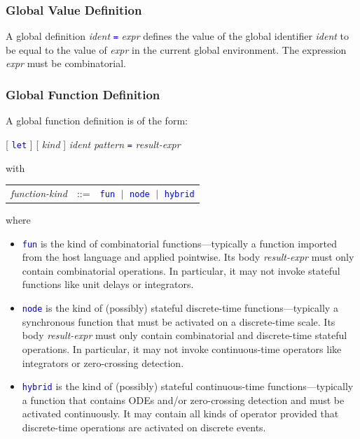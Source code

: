 \documentclass[11pt,titlepage,twoside]{report}
\newcommand{\alt}{\;|\;}
\newcommand{\term}[1]{\textcolor{Blue}{\tt #1}}
\newcommand{\nterm}[1]{\textcolor{BrickRed}{\it #1}}
\newcommand{\term}[1]{{\tt #1}}
\newcommand{\nterm}[1]{{\em #1}}
\begin{document}
\subsubsection{Global Value Definition}

A global definition \nterm{ident} \term{=} \nterm{expr} defines the value
of the global identifier \nterm{ident} to be equal to the value of 
\nterm{expr} in the current global environment.
The expression \nterm{expr} must be combinatorial.

\subsubsection{Global Function Definition}

A global function definition is of the form:
\begin{center}
  [ \term{let} ] [ \nterm{kind} ] \nterm{ident} \nterm{pattern} \term{=}
                    \nterm{result-expr}
\end{center}
with
\begin{center}
  \begin{tabular}{lcl}
    \nterm{function-kind} & ::=  & \term{fun} $\alt$ \term{node}
                                              $\alt$ \term{hybrid}
\end{tabular}
\end{center}

\noindent
where
\begin{itemize}
\item
\term{fun} is the kind of combinatorial functions---typically a
function imported from the host language and applied pointwise. Its
body \nterm{result-expr} must only contain combinatorial operations.
In particular, it may not invoke stateful functions like unit delays or 
integrators.

\item
\term{node} is the kind of (possibly) stateful discrete-time
functions---typically a synchronous function that must be activated
on a discrete-time scale.
Its body \nterm{result-expr} must only contain combinatorial and 
discrete-time stateful operations.
In particular, it may not invoke continuous-time operators like
integrators or zero-crossing detection.

\item
\term{hybrid} is the kind of (possibly) stateful continuous-time
functions---typically a function that contains ODEs and/or
zero-crossing detection and must be activated continuously. It may
contain all kinds of operator provided that discrete-time operations are 
activated on discrete events.
\end{itemize}
\end{document}
